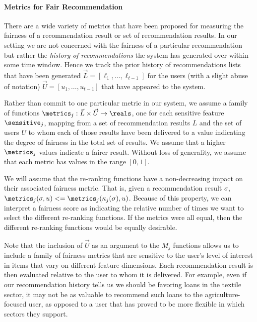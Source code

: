 \noindent \paragraph{Metrics for Fair Recommendation} \newline
\indent There are a wide variety of metrics that have been proposed for measuring the fairness of a recommendation result or set of recommendation results.  In our setting we are not concerned with the fairness of a particular recommendation but rather the \emph{history of recommendations} the system has generated over within some time window.  Hence we track the prior history of recommendations lists that have been generated $\vec{L} = [\ell_1, \ldots, \ell_{t-1}]$ for the users (with a slight abuse of notation) $\vec{U} = [u_1, \ldots, u_{t-1} ]$ that have appeared to the system.  

Rather than commit to one particular metric in our system, we assume a family of functions $\metrics_j: \vec{L} \times \vec{U} \rightarrow \reals$, one for each sensitive feature $\sensitive_j$, mapping from a set of recommendation results $L$ and the set of users $U$ to whom each of those results have been delivered to a value indicating the degree of fairness in the total set of results. We assume that a higher $\metrics_j$ values indicate a fairer result. Without loss of generality, we assume that each metric has values in the range $[0,1]$.

We will assume that the re-ranking functions have a non-decreasing impact on their associated fairness metric. That is, given a recommendation result $\sigma$, $\metrics_j(\sigma, u) <=  \metrics_j(\kappa_j(\sigma), u)$.  Because of this property, we can interpret a fairness score as indicating the relative number of times we want to select the different re-ranking functions. If the metrics were all equal, then the different re-ranking functions would be equally desirable.

Note that the inclusion of $\vec{U}$ as an argument to the $M_j$ functions allows us to include a family of fairness metrics that are sensitive to the user's level of interest in items that vary on different feature dimensions. Each recommendation result is then evaluated relative to the user to whom it is delivered. For example, even if our recommendation history tells us we should be favoring loans in the textile sector, it may not be as valuable to recommend such loans to the agriculture-focused user, as opposed to a user that has proved to be more flexible in which sectors they support.

